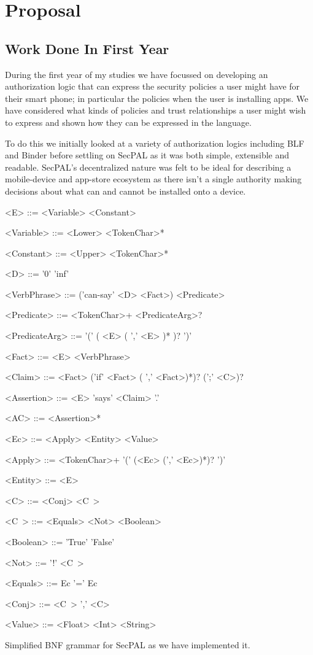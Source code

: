 \documentclass[report.tex]{subfiles}
\begin{document}
\section{Proposal}

\subsection{Work Done In First Year}

During the first year of my studies we have focussed on developing an
authorization logic that can express the security policies a user might have for
their smart phone; in particular the policies when the user is installing apps.
We have considered what kinds of policies and trust
relationships a user might wish to express and shown how they can be expressed
in the language.

To do this we initially looked at a variety of authorization logics including
BLF\cite{Whitehead:2004bu} and Binder\cite{DeTreville:2002ff} before settling on
SecPAL as it was both simple, extensible and readable.  SecPAL's decentralized
nature was felt to be ideal for describing a mobile-device and app-store
ecosystem as there isn't a single authority making decisions about what can and
cannot be installed onto a device.  

\begin{marginfigure}\label{secpal:bnf}
  \begin{grammar}\footnotesize
<E> ::= <Variable> \alt <Constant>

<Variable> ::= <Lower> <TokenChar>*

<Constant> ::= <Upper> <TokenChar>*

<D> ::= '0' \alt 'inf'

<VerbPhrase> ::= ('can-say' <D> <Fact>) \alt <Predicate>

<Predicate> ::= <TokenChar>+ <PredicateArg>?

<PredicateArg> ::= '(' ( <E> ( ',' <E> )* )? ')'

<Fact> ::= <E> <VerbPhrase>

<Claim> ::= <Fact> ('if' <Fact> ( ',' <Fact>)*)? (';' <C>)?

<Assertion> ::= <E> 'says' <Claim> '.'

<AC> ::= <Assertion>*

<Ec> ::= <Apply> \alt <Entity> \alt <Value>

<Apply> ::= <TokenChar>+ '(' (<Ec> (',' <Ec>)*)? ')'

<Entity> ::= <E>

<C> ::= <Conj> \alt <C~>

<C~> ::= <Equals> \alt <Not> \alt <Boolean>

<Boolean> ::= 'True' \alt 'False'

<Not> ::= '!' <C~>

<Equals> ::= Ec '=' Ec

<Conj> ::= <C~> ',' <C>

<Value> ::= <Float> \alt <Int> \alt <String>
  \end{grammar}
  \caption{Simplified BNF grammar for SecPAL as we have implemented it.}
\end{marginfigure}
\end{document}
